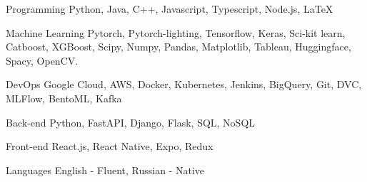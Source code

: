 

\begin{cvskills}

    \cvskill
      {Programming} %
      {Python, Java, C++, Javascript, Typescript, Node.js, LaTeX} %

  \cvskill
    {Machine Learning} %
    {Pytorch, Pytorch-lighting, Tensorflow, Keras, Sci-kit learn, Catboost, XGBoost, Scipy, Numpy, Pandas, Matplotlib, Tableau, Huggingface, Spacy, OpenCV.} %

  \cvskill
    {DevOps} %
    {Google Cloud, AWS, Docker, Kubernetes, Jenkins, BigQuery, Git, DVC, MLFlow, BentoML, Kafka} %

  \cvskill
    {Back-end} %
    {Python, FastAPI, Django, Flask, SQL, NoSQL} %

  \cvskill
    {Front-end} %
    {React.js, React Native, Expo, Redux} %

  \cvskill
    {Languages} %
    {English - Fluent, Russian - Native} %

\end{cvskills}
